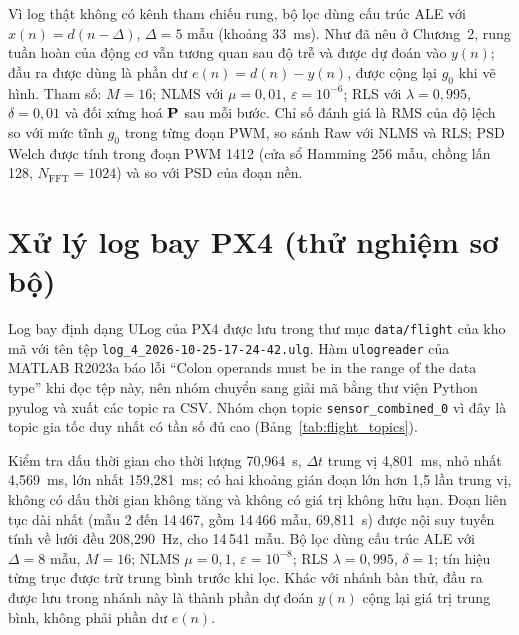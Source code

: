 \documentclass[../main.tex]{subfiles}
\begin{document}
Vì log thật không có kênh tham chiếu rung, bộ lọc dùng cấu trúc ALE với $x(n)=d(n-\Delta)$, $\Delta=5$ mẫu (khoảng 33~ms). Như đã nêu ở Chương~2, rung tuần hoàn của động cơ vẫn tương quan sau độ trễ và được dự đoán vào $y(n)$; đầu ra được dùng là phần dư $e(n)=d(n)-y(n)$, được cộng lại $g_0$ khi vẽ hình. Tham số: $M=16$; NLMS với $\mu=0{,}01$, $\varepsilon=10^{-6}$; RLS với $\lambda=0{,}995$, $\delta=0{,}01$ và đối xứng hoá $\mathbf{P}$ sau mỗi bước. Chỉ số đánh giá là RMS của độ lệch so với mức tĩnh $g_0$ trong từng đoạn PWM, so sánh Raw với NLMS và RLS; PSD Welch được tính trong đoạn PWM 1412 (cửa sổ Hamming 256 mẫu, chồng lấn 128, $N_{\mathrm{FFT}}=1024$) và so với PSD của đoạn nền.

\section{Xử lý log bay PX4 (thử nghiệm sơ bộ)}
\label{sec:flight_proc}

Log bay định dạng ULog của PX4 được lưu trong thư mục \texttt{data/flight} của kho mã với tên tệp \nolinkurl{log_4_2026-10-25-17-24-42.ulg}. Hàm \texttt{ulogreader} của MATLAB R2023a báo lỗi ``Colon operands must be in the range of the data type'' khi đọc tệp này, nên nhóm chuyển sang giải mã bằng thư viện Python pyulog và xuất các topic ra CSV. Nhóm chọn topic \texttt{sensor\_combined\_0} vì đây là topic gia tốc duy nhất có tần số đủ cao (Bảng~\ref{tab:flight_topics}).

Kiểm tra dấu thời gian cho thời lượng 70,964~s, $\Delta t$ trung vị 4,801~ms, nhỏ nhất 4,569~ms, lớn nhất 159,281~ms; có hai khoảng gián đoạn lớn hơn 1,5 lần trung vị, không có dấu thời gian không tăng và không có giá trị không hữu hạn. Đoạn liên tục dài nhất (mẫu 2 đến 14\,467, gồm 14\,466 mẫu, 69,811~s) được nội suy tuyến tính về lưới đều 208,290~Hz, cho 14\,541 mẫu. Bộ lọc dùng cấu trúc ALE với $\Delta=8$ mẫu, $M=16$; NLMS $\mu=0{,}1$, $\varepsilon=10^{-8}$; RLS $\lambda=0{,}995$, $\delta=1$; tín hiệu từng trục được trừ trung bình trước khi lọc. Khác với nhánh bàn thử, đầu ra được lưu trong nhánh này là thành phần dự đoán $y(n)$ cộng lại giá trị trung bình, không phải phần dư $e(n)$.
\end{document}
